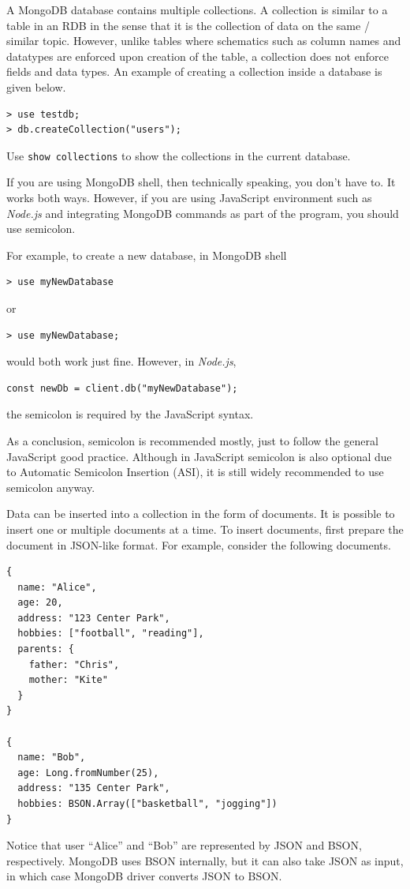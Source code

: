 A MongoDB database contains multiple collections. A collection is similar to a table in an RDB in the sense that it is the collection of data on the same / similar topic. However, unlike tables where schematics such as column names and datatypes are enforced upon creation of the table, a collection does not enforce fields and data types. An example of creating a collection inside a database is given below.
\begin{lstlisting}
> use testdb;
> db.createCollection("users");
\end{lstlisting}
Use \verb|show collections| to show the collections in the current database.

\begin{shortbox}

If you are using MongoDB shell, then technically speaking, you don't have to. It works both ways. However, if you are using JavaScript environment such as \textit{Node.js} and integrating MongoDB commands as part of the program, you should use semicolon.

For example, to create a new database, in MongoDB shell
\begin{lstlisting}
> use myNewDatabase
\end{lstlisting}
or
\begin{lstlisting}
> use myNewDatabase;
\end{lstlisting}
would both work just fine. However, in \textit{Node.js},
\begin{lstlisting}
const newDb = client.db("myNewDatabase");
\end{lstlisting}
the semicolon is required by the JavaScript syntax.

As a conclusion, semicolon is recommended mostly, just to follow the general JavaScript good practice. Although in JavaScript semicolon is also optional due to Automatic Semicolon Insertion (ASI), it is still widely recommended to use semicolon anyway.
\end{shortbox}

Data can be inserted into a collection in the form of documents. It is possible to insert one or multiple documents at a time. To insert documents, first prepare the document in JSON-like format. For example, consider the following documents.
\begin{lstlisting}
{
  name: "Alice",
  age: 20,
  address: "123 Center Park",
  hobbies: ["football", "reading"],
  parents: {
    father: "Chris",
    mother: "Kite"
  }
}

{
  name: "Bob",
  age: Long.fromNumber(25),
  address: "135 Center Park",
  hobbies: BSON.Array(["basketball", "jogging"])
}
\end{lstlisting}
Notice that user ``Alice'' and ``Bob'' are represented by JSON and BSON, respectively. MongoDB uses BSON internally, but it can also take JSON as input, in which case MongoDB driver converts JSON to BSON.

